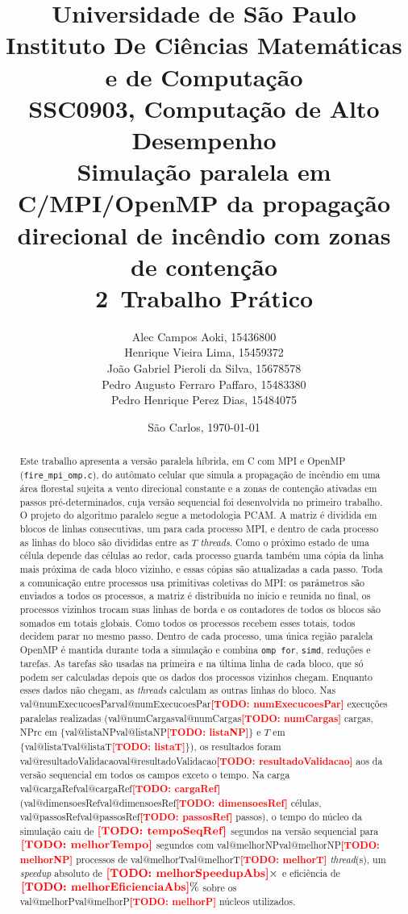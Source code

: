 \documentclass[11pt,a4paper]{article}
\title{\vspace{-1.5cm}
  \large Universidade de São Paulo\\
  \large Instituto De Ciências Matemáticas e de Computação\\
  \large SSC0903, Computação de Alto Desempenho\\[0.6cm]
  \textbf{\Large Simulação paralela em C/MPI/OpenMP da propagação\\direcional de incêndio com zonas de contenção}\\[0.2cm]
  \normalsize 2\textordmasculine \, Trabalho Prático}
\author{
  Alec Campos Aoki, 15436800 \\
  Henrique Vieira Lima, 15459372 \\
  João Gabriel Pieroli da Silva, 15678578 \\
  Pedro Augusto Ferraro Paffaro, 15483380 \\
  Pedro Henrique Perez Dias, 15484075 \\
}
\date{São Carlos, \today}
\makeatletter
\newcommand{\TODO}[1]{\textcolor{red}{\textbf{[TODO: #1]}}}
\newcommand{\pct}{\%}
\newcommand{\Valor}[1]{\ifcsname val@#1\endcsname\csname val@#1\endcsname\else\TODO{#1}\fi}
\makeatother
\begin{document}
\maketitle

\begin{abstract}
\noindent
Este trabalho apresenta a versão paralela híbrida, em C com MPI e OpenMP (\texttt{fire\_mpi\_omp.c}), do autômato celular que simula a propagação de incêndio em uma área florestal sujeita a vento direcional constante e a zonas de contenção ativadas em passos pré-determinados, cuja versão sequencial foi desenvolvida no primeiro trabalho. O projeto do algoritmo paralelo segue a metodologia PCAM. A matriz é dividida em blocos de linhas consecutivas, um para cada processo MPI, e dentro de cada processo as linhas do bloco são divididas entre as $T$ \emph{threads}. Como o próximo estado de uma célula depende das células ao redor, cada processo guarda também uma cópia da linha mais próxima de cada bloco vizinho, e essas cópias são atualizadas a cada passo. Toda a comunicação entre processos usa primitivas coletivas do MPI: os parâmetros são enviados a todos os processos, a matriz é distribuída no início e reunida no final, os processos vizinhos trocam suas linhas de borda e os contadores de todos os blocos são somados em totais globais. Como todos os processos recebem esses totais, todos decidem parar no mesmo passo. Dentro de cada processo, uma única região paralela OpenMP é mantida durante toda a simulação e combina \texttt{omp for}, \texttt{simd}, reduções e tarefas. As tarefas são usadas na primeira e na última linha de cada bloco, que só podem ser calculadas depois que os dados dos processos vizinhos chegam. Enquanto esses dados não chegam, as \emph{threads} calculam as outras linhas do bloco. Nas \Valor{numExecucoesPar} execuções paralelas realizadas (\Valor{numCargas} cargas, NPrc em \{\Valor{listaNP}\} e $T$ em \{\Valor{listaT}\}), os resultados foram \Valor{resultadoValidacao} aos da versão sequencial em todos os campos exceto o tempo. Na carga \Valor{cargaRef} (\Valor{dimensoesRef} células, \Valor{passosRef} passos), o tempo do núcleo da simulação caiu de $\Valor{tempoSeqRef}$ segundos na versão sequencial para $\Valor{melhorTempo}$ segundos com \Valor{melhorNP} processos de \Valor{melhorT} \emph{thread}(s), um \emph{speedup} absoluto de $\Valor{melhorSpeedupAbs}\times$ e eficiência de $\Valor{melhorEficienciaAbs}\pct$ sobre os \Valor{melhorP} núcleos utilizados.
\end{abstract}

\tableofcontents
\vspace{0.5cm}
\end{document}
